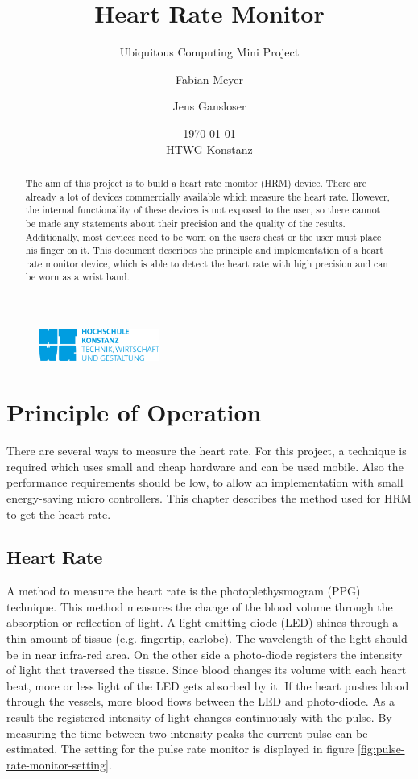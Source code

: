 \documentclass[notitlepage]{scrreprt}
\begin{document}
\title{Heart Rate Monitor}
\subtitle{Ubiquitous Computing Mini Project}
\author{Fabian Meyer \and Jens Gansloser}
\date{\today \\ HTWG Konstanz}
\maketitle

\begin{figure}[H]
	\centering
	\includegraphics[width=150px]{images/htwgLogo.jpg}
\end{figure}

\begin{abstract}
The aim of this project is to build a heart rate monitor (HRM) device. There are already a lot of devices commercially available which measure the heart rate. However, the internal functionality of these devices is not exposed to the user, so there cannot be made any statements about their precision and the quality of the results. Additionally, most devices need to be worn on the users chest or the user must place his finger on it. This document describes the principle and implementation of a heart rate monitor device, which is able to detect the heart rate with high precision and can be worn as a wrist band.
\end{abstract}
\clearpage

\tableofcontents

\chapter{Principle of Operation}
\label{chap:principle-of-operation}

There are several ways to measure the heart rate. For this project, a technique is required which uses small and cheap hardware and can be used mobile. Also the performance requirements should be low, to allow an implementation with small energy-saving micro controllers. This chapter describes the method used for HRM to get the heart rate.

\section{Heart Rate}
A method to measure the heart rate is the photoplethysmogram (PPG) technique. This method measures the change of the blood volume through the absorption or reflection of light. A light emitting diode (LED) shines through a thin amount of tissue (e.g. fingertip, earlobe). The wavelength of the light should be in near infra-red area. On the other side a photo-diode registers the intensity of light that traversed the tissue. Since blood changes its volume with each heart beat, more or less light of the LED gets absorbed by it. If the heart pushes blood through the vessels, more blood flows between the LED and photo-diode. As a result the registered intensity of light changes continuously with the pulse. By measuring the time between two intensity peaks the current pulse can be estimated. The setting for the pulse rate monitor is displayed in figure \ref{fig:pulse-rate-monitor-setting}.
\end{document}

